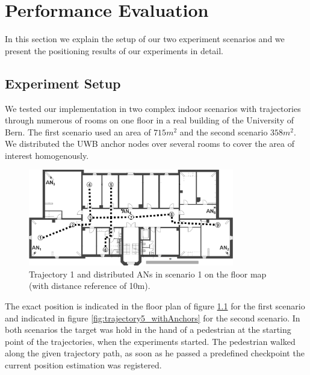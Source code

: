 
\chapter{Performance Evaluation} %

\label{Chapter6} %
In this section we explain the setup of our two experiment scenarios and we present the positioning results of our experiments in detail.


\section{Experiment Setup}
We tested our implementation in two complex indoor scenarios with trajectories through numerous of rooms on one floor in a real building of the University of Bern. The first scenario used an area of $715m^2$ and the second scenario $358m^2$. We distributed the UWB anchor nodes over several rooms to cover the area of interest homogenously.
\begin{figure}[th]
\centering
\includegraphics[width=0.8\textwidth]{Figures/trajectory1_withAnchors}
\decoRule
\caption[Anchor Node Positions of Scenario 1]{Trajectory 1 and distributed ANs in scenario 1 on the floor map (with distance reference of 10m).}
\label{fig:trajectory1_withAnchors}
\end{figure}The exact position is indicated in the floor plan of figure \ref{fig:trajectory1_withAnchors} for the first scenario and indicated in figure \ref{fig:trajectory5_withAnchors} for the second scenario. In both scenarios the target was hold in the hand of a pedestrian at the starting point of the trajectories, when the experiments started. The pedestrian walked along the given trajectory path, as soon as he passed a predefined checkpoint the current position estimation was registered.\\
